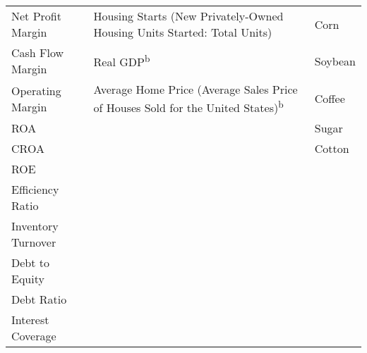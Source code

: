 \documentclass[12pt,a4paper,english]{article}
\begin{document}
\begin{table}[H]
\begin{minipage}{\textwidth}
{\begin{tabular}{lll}
				Net Profit Margin                                        & Housing Starts (New Privately-Owned Housing Units Started: Total Units)                          & Corn                                        \\
				Cash Flow Margin                                         & Real GDP\textsuperscript{b}                                                                      & Soybean                                     \\
				Operating Margin                                         & Average Home Price (Average Sales Price of Houses Sold for the United States)\textsuperscript{b} & Coffee                                      \\
				ROA                                                      &                                                                                                  & Sugar                                       \\
				CROA                                                     &                                                                                                  & Cotton                                      \\
				ROE                                                      &                                                                                                  &                                             \\
				Efficiency Ratio                                         &                                                                                                  &                                             \\
				Inventory Turnover                                       &                                                                                                  &                                             \\
				Debt to Equity                                           &                                                                                                  &                                             \\
				Debt Ratio                                               &                                                                                                  &                                             \\
				Interest Coverage                                        &                                                                                                  &                                             \\

\end{tabular}}
\end{minipage}
\end{table}
\end{document}
